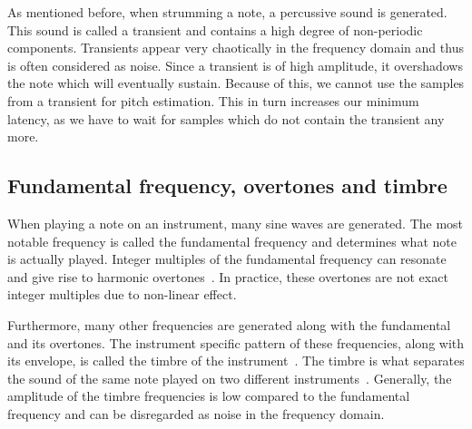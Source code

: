 \documentclass[10pt,twocolumn]{article}
\begin{document}
As mentioned before, when strumming a note, a percussive sound is generated. This sound is called a transient and contains a high degree of non-periodic components. Transients appear very chaotically in the frequency domain and thus is often considered as noise. Since a transient is of high amplitude, it overshadows the note which will eventually sustain. Because of this, we cannot use the samples from a transient for pitch estimation. This in turn increases our minimum latency, as we have to wait for samples which do not contain the transient any more.

\subsection{Fundamental frequency, overtones and timbre}  \label{sec:overtones}
When playing a note on an instrument, many sine waves are generated. The most notable frequency is called the fundamental frequency and determines what note is actually played. Integer multiples of the fundamental frequency can resonate and give rise to harmonic overtones~\cite{overtones}. In practice, these overtones are not exact integer multiples due to non-linear effect.

Furthermore, many other frequencies are generated along with the fundamental and its overtones. The instrument specific pattern of these frequencies, along with its envelope, is called the timbre of the instrument~\cite{timbre}. The timbre is what separates the sound of the same note played on two different instruments~\cite{perception}. Generally, the amplitude of the timbre frequencies is low compared to the fundamental frequency and can be disregarded as noise in the frequency domain.
\end{document}
